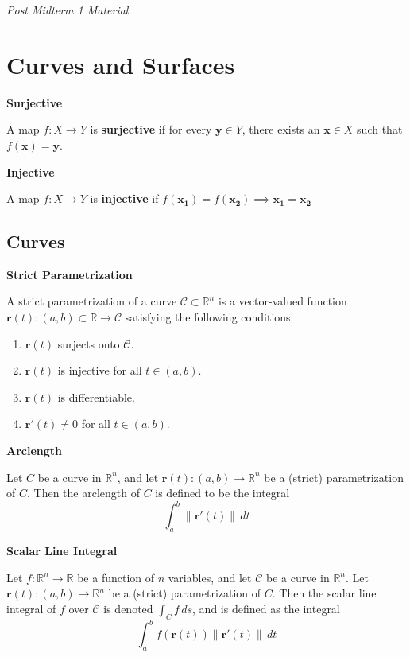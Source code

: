 \documentclass{article}
\newcommand{\R}{\mathbb{R}}
\newenvironment{definition}[1]{
    \par\noindent\textbf{#1}\par\noindent
}{
    \par \vspace{0.5cm}
}
\begin{document}
\hrulefill

\begin{center}
    \textit{Post Midterm 1 Material}
\end{center}

\section{Curves and Surfaces}

\begin{definition}{Surjective}
    A map $f : X \to Y$ is \textbf{surjective} if for every $\bm{y} \in Y$, there exists an $\bm{x} \in X$ such that $f(\bm{x}) = \bm{y}$.
    \end{definition}

\begin{definition}{Injective}
    A map \(f: X \to Y\) is \textbf{injective} if \(f(\bm{x_1}) = f(\bm{x_2}) \implies \bm{x_1} = \bm{x_2}\)
\end{definition}

\subsection{Curves}

\begin{definition}{Strict Parametrization}
A strict parametrization of a curve \( \mathcal{C} \subset \R^n \) is a vector-valued function \( \bm{r}(t) : (a, b) \subset \R \to \mathcal{C} \) satisfying the following conditions:
\begin{enumerate}
    \item \( \bm{r}(t) \) surjects onto \( \mathcal{C} \).
    \item \( \bm{r}(t) \) is injective for all \( t \in (a, b) \).
    \item \( \bm{r}(t) \) is differentiable.
    \item \( \bm{r}'(t) \neq 0 \) for all \( t \in (a, b) \).
\end{enumerate}
\end{definition}

\begin{definition}{Arclength}
Let \( C \) be a curve in \( \R^n \), and let \( \bm{r}(t) : (a, b) \to \R^n \) be a (strict) parametrization of \( C \).
Then the arclength of \( C \) is defined to be the integral
\[
\int_{a}^{b} \left\| \bm{r}'(t) \right\| \, dt
\]
\end{definition}

\begin{definition}{Scalar Line Integral}
Let \( f : \R^n \to \R \) be a function of \( n \) variables, and let \( \mathcal{C} \) be a curve in \( \R^n \). Let \( \bm{r}(t) : (a, b) \to \R^n \) be a (strict) parametrization of \( C \). Then the scalar line integral of \( f \) over \( \mathcal{C} \) is denoted \(\int_C f \, ds\), and is defined as the integral
\[
\int_{a}^{b} f(\bm{r}(t)) \left\| \bm{r}'(t) \right\| \, dt
\]
\end{definition}
\end{document}
